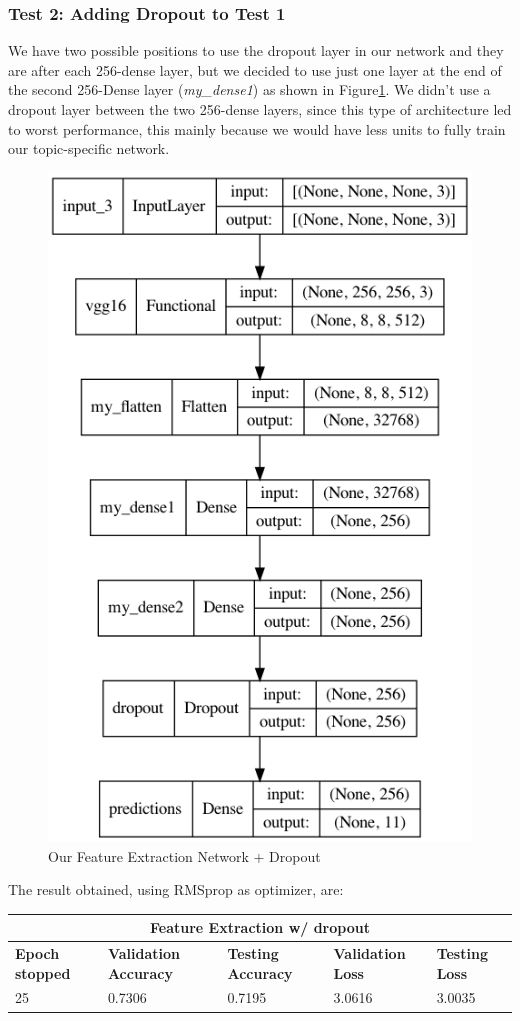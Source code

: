 \subsubsection{Test 2: Adding Dropout to Test 1}
We have two possible positions to use the dropout layer in our network and they are after each 256-dense layer, but we decided to use just one layer at the end of the second 256-Dense layer (\textit{my\_dense1}) as shown in Figure\ref{fig:vgg16fe2}. We didn't use a dropout layer between the two 256-dense layers, since this type of architecture led to worst performance, this mainly because we would have less units to fully train our topic-specific network.
\begin{figure}[H]
	\centering
	\includegraphics[height=0.45\textwidth]{img/vgg16/vgg16fe2.png}
	\caption{Our Feature Extraction Network + Dropout}
	\label{fig:vgg16fe2}
\end{figure}
  

\noindent The result obtained, using RMSprop as optimizer, are:

\medskip

\begin{tabular}{ |p{2cm}|p{2cm}|p{2cm}|p{2cm}|p{2cm}|  }
\hline
\multicolumn{5}{|c|}{Feature Extraction w/ dropout} \\
\hline
\textbf{Epoch stopped} & \textbf{Validation Accuracy} & \textbf{Testing Accuracy} & \textbf{Validation Loss} & \textbf{Testing Loss} \\
\hline
25 & 0.7306 & 0.7195 & 3.0616 & 3.0035\\
\hline
\end{tabular}

\medskip


